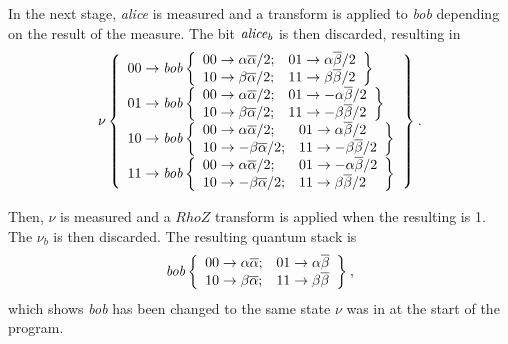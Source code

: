 In the next stage, \emph{alice} is measured and a \nottr{} transform is 
applied to \emph{bob} depending on the result of the measure. 
The bit $\text{\emph{alice}}_b$ is then discarded, resulting in
\[\nu\left\{\begin{array}{l} 00\to {\ensuremath{\text{\emph{bob}}\left\{\begin{array}{ll} 00\to {\alpha\overline{\alpha}/2};&01\to {\alpha\overline{\beta}/2}\\10\to {\beta\overline{\alpha}/2};&11\to {\beta\overline{\beta}/2} \end{array} \right\}^{}}}\\01\to {\ensuremath{\text{\emph{bob}}\left\{\begin{array}{ll} 00\to {\alpha\overline{\alpha}/2};&01\to {-\alpha\overline{\beta}/2}\\10\to {\beta\overline{\alpha}/2};&11\to {-\beta\overline{\beta}/2} \end{array} \right\}^{}}}\\10\to {\ensuremath{\text{\emph{bob}}\left\{\begin{array}{ll} 00\to {\alpha\overline{\alpha}/2};&01\to {\alpha\overline{\beta}/2}\\10\to {-\beta\overline{\alpha}/2};&11\to {-\beta\overline{\beta}/2} \end{array} \right\}^{}}}\\11\to {\ensuremath{\text{\emph{bob}}\left\{\begin{array}{ll} 00\to {\alpha\overline{\alpha}/2};&01\to {-\alpha\overline{\beta}/2}\\10\to {-\beta\overline{\alpha}/2};&11\to {\beta\overline{\beta}/2} \end{array} \right\}^{}}} \end{array} \right\}^{}.
\]

Then, $\nu$ is measured and a $RhoZ$ transform is applied when the resulting 
\bit{} is 1. The \bit{} $\nu_b$ is then discarded. The
resulting quantum stack is
\[\text{\emph{bob}}\left\{\begin{array}{ll} 00\to {\alpha\overline{\alpha}};&01\to {\alpha\overline{\beta}}\\10\to {\beta\overline{\alpha}};&11\to {\beta\overline{\beta}} \end{array} \right\}^{},
\]
which shows \emph{bob} has been changed to the same state $\nu$ was
in at the start of the program.